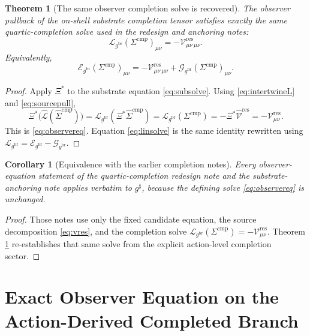 \documentclass[11pt]{article}
\newcommand{\ObserverMap}{\Xi}
\newcommand{\ObserverMetric}{g^{\mathrm{br}}}
\newcommand{\CompletedMetric}{g^{\sharp}}
\newcommand{\CompShift}{\Sigma^{\mathrm{cmp}}}
\newcommand{\CompLift}{\widehat\Sigma^{\mathrm{cmp}}}
\newcommand{\ResidualCore}{\mathcal V_{\mu\nu}^{\mathrm{res}}}
\newcommand{\ResidualLift}{\widehat{\mathcal V}^{\mathrm{res}}}
\newcommand{\SubReducedEin}{\widehat{\mathcal L}}
\newcommand{\ReducedEin}{\mathcal L_{\ObserverMetric}}
\newcommand{\GaugeBook}{\mathcal G_{\ObserverMetric}}
\newcommand{\EinLin}{\mathcal E_{\ObserverMetric}}
\newtheorem{corollary}{Corollary}
\newtheorem{theorem}{Theorem}
\begin{document}
\begin{theorem}[The same observer completion solve is recovered]
\label{thm:pullback}
The observer pullback of the on-shell substrate completion tensor satisfies exactly the same quartic-completion solve used in the redesign and anchoring notes:
\begin{equation}
\ReducedEin(\CompShift)_{\mu\nu}
=
-\ResidualCore{}_{\mu\nu}.
\label{eq:observereq}
\end{equation}
Equivalently,
\begin{equation}
\EinLin(\CompShift)_{\mu\nu}
=
-\ResidualCore{}_{\mu\nu}
+\GaugeBook(\CompShift)_{\mu\nu}.
\label{eq:linsolve}
\end{equation}
\end{theorem}

\begin{proof}
Apply \(\ObserverMap^*\) to the substrate equation \eqref{eq:subsolve}. Using \eqref{eq:intertwineL} and \eqref{eq:sourcepull},
\[
\ObserverMap^*\bigl(\SubReducedEin(\CompLift)\bigr)
=
\ReducedEin(\ObserverMap^*\CompLift)
=
\ReducedEin(\CompShift)
=
-\ObserverMap^*\ResidualLift
=
-\ResidualCore.
\]
This is \eqref{eq:observereq}. Equation \eqref{eq:linsolve} is the same identity rewritten using \(\ReducedEin=\EinLin-\GaugeBook\).
\end{proof}

\begin{corollary}[Equivalence with the earlier completion notes]
\label{cor:equiv}
Every observer-equation statement of the quartic-completion redesign note and the substrate-anchoring note applies verbatim to \(\CompletedMetric\), because the defining solve \eqref{eq:observereq} is unchanged.
\end{corollary}

\begin{proof}
Those notes use only the fixed candidate equation, the source decomposition \eqref{eq:vres}, and the completion solve \(\ReducedEin(\CompShift)=-\ResidualCore\). Theorem \ref{thm:pullback} re-establishes that same solve from the explicit action-level completion sector.
\end{proof}

\section{Exact Observer Equation on the Action-Derived Completed Branch}
\end{document}

